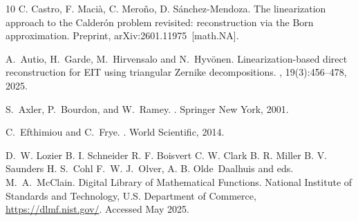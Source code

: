 \documentclass[reqno]{amsart}
\numberwithin{equation}{section}
\numberwithin{figure}{section}
\numberwithin{table}{section}
\theoremstyle{plain}
\theoremstyle{definition}
\theoremstyle{remark}
\begin{document}
\begin{thebibliography}{10}
    C. Castro, F. Maci{\`a}, C. Mero{\~n}o, D. S{\'a}nchez-Mendoza.
    \newblock The linearization approach to the {C}alder{\'o}n problem revisited: reconstruction via the {B}orn approximation.
    \newblock Preprint, arXiv:2601.11975~[math.NA].


    A.~Autio, H.~Garde, M.~Hirvensalo and N.~Hyv\"onen.
    \newblock Linearization-based direct reconstruction for {EIT} using triangular {Z}ernike decompositions.
    , 19(3):456--478, 2025.


    S.~Axler, P.~Bourdon, and W.~Ramey.
    .
    \newblock Springer New York, 2001.


    C.~Efthimiou and C.~Frye.
    .
    \newblock World Scientific, 2014.


    D.~W. Lozier B. I. Schneider R. F. Boisvert C. W. Clark B. R. Miller B. V.
    Saunders H. S.~Cohl F.~W. J.~Olver, A. B. Olde~Daalhuis and eds.
    M.~A.~McClain.
     {D}igital {L}ibrary of {M}athematical {F}unctions.
    \newblock National Institute of Standards and Technology, U.S. Department of
    Commerce, \url{https://dlmf.nist.gov/}.
    \newblock Accessed May 2025.


    \end{thebibliography}
\end{document}
